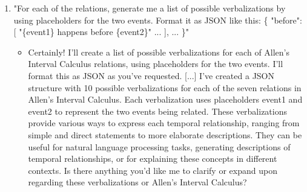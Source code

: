 \documentclass[11pt]{article}
\begin{document}
\begin{enumerate}
\begin{itemize}
I've created a new set of 10 examples for each of the seven relations in Allen's Interval Calculus. These examples are distinct from the previous set and adhere to the guidelines you provided. For the "equals" relation, I've ensured that all examples focus solely on temporal periods.
Each relation is represented by an array of examples, with each example containing "event1", "event2", and an "example" sentence describing the relation between the events.
Is there anything you'd like me to clarify or expand upon regarding these new examples or Allen's Interval Calculus?
    \end{itemize}
  \item "For each of the relations, generate me a list of possible verbalizations by using placeholders for the two events. Format it as JSON like this: \{ "before": [ "\{event1\} happens before \{event2\}" ... ], ... \}"
    \begin{itemize}
      \item Certainly! I'll create a list of possible verbalizations for each of Allen's Interval Calculus relations, using placeholders for the two events. I'll format this as JSON as you've requested.
        [...]
        I've created a JSON structure with 10 possible verbalizations for each of the seven relations in Allen's Interval Calculus. Each verbalization uses placeholders {event1} and {event2} to represent the two events being related.
These verbalizations provide various ways to express each temporal relationship, ranging from simple and direct statements to more elaborate descriptions. They can be useful for natural language processing tasks, generating descriptions of temporal relationships, or for explaining these concepts in different contexts.
Is there anything you'd like me to clarify or expand upon regarding these verbalizations or Allen's Interval Calculus?
    \end{itemize}
\end{enumerate}
\end{document}
